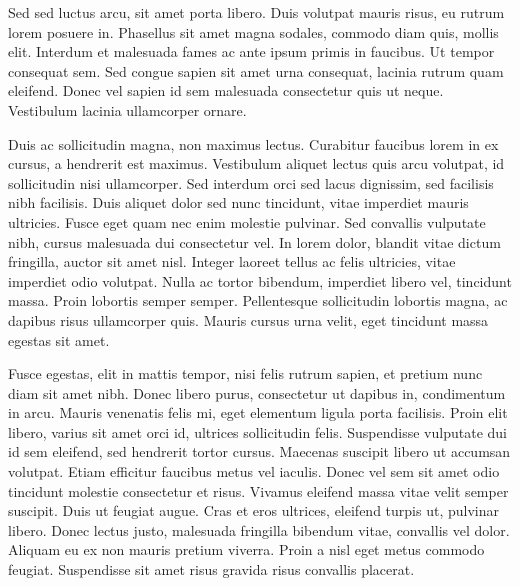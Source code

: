 \documentclass[book,A4paper,10pt,twoside,oldfontcommands]{memoir}\usepackage[]{graphicx}\usepackage[usenames,dvipsnames]{color}
\begin{document}
\begin{btUnit}
Sed sed luctus arcu, sit amet porta libero. Duis volutpat mauris
risus, eu rutrum lorem posuere in. Phasellus sit amet magna sodales,
commodo diam quis, mollis elit. Interdum et malesuada fames ac ante
ipsum primis in faucibus. Ut tempor consequat sem. Sed congue sapien
sit amet urna consequat, lacinia rutrum quam eleifend. Donec vel
sapien id sem malesuada consectetur quis ut neque. Vestibulum lacinia
ullamcorper ornare.

Duis ac sollicitudin magna, non maximus lectus. Curabitur faucibus
lorem in ex cursus, a hendrerit est maximus. Vestibulum aliquet lectus
quis arcu volutpat, id sollicitudin nisi ullamcorper. Sed interdum
orci sed lacus dignissim, sed facilisis nibh facilisis. Duis aliquet
dolor sed nunc tincidunt, vitae imperdiet mauris ultricies. Fusce eget
quam nec enim molestie pulvinar. Sed convallis vulputate nibh, cursus
malesuada dui consectetur vel. In lorem dolor, blandit vitae dictum
fringilla, auctor sit amet nisl. Integer laoreet tellus ac felis
ultricies, vitae imperdiet odio volutpat. Nulla ac tortor bibendum,
imperdiet libero vel, tincidunt massa. Proin lobortis semper semper.
Pellentesque sollicitudin lobortis magna, ac dapibus risus ullamcorper
quis. Mauris cursus urna velit, eget tincidunt massa egestas sit amet.

Fusce egestas, elit in mattis tempor, nisi felis rutrum sapien, et
pretium nunc diam sit amet nibh. Donec libero purus, consectetur ut
dapibus in, condimentum in arcu. Mauris venenatis felis mi, eget
elementum ligula porta facilisis. Proin elit libero, varius sit amet
orci id, ultrices sollicitudin felis. Suspendisse vulputate dui id sem
eleifend, sed hendrerit tortor cursus. Maecenas suscipit libero ut
accumsan volutpat. Etiam efficitur faucibus metus vel iaculis. Donec
vel sem sit amet odio tincidunt molestie consectetur et risus. Vivamus
eleifend massa vitae velit semper suscipit. Duis ut feugiat augue.
Cras et eros ultrices, eleifend turpis ut, pulvinar libero. Donec
lectus justo, malesuada fringilla bibendum vitae, convallis vel dolor.
Aliquam eu ex non mauris pretium viverra. Proin a nisl eget metus
commodo feugiat. Suspendisse sit amet risus gravida risus convallis
placerat.



\end{btUnit}
\end{document}
